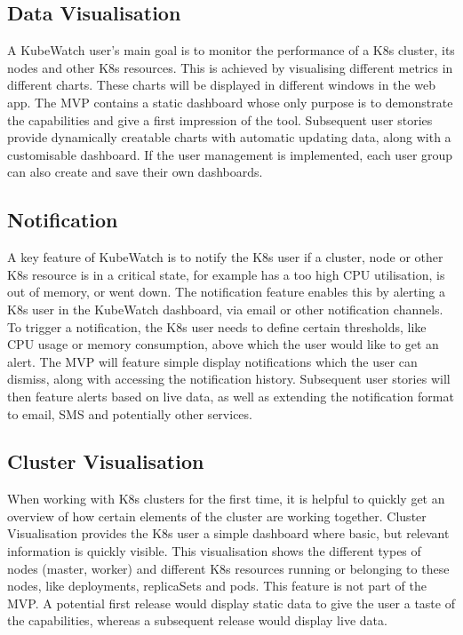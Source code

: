 \subsection{Data Visualisation}
A KubeWatch user's main goal is to monitor the performance of a K8s cluster, its nodes and other K8s resources. This is achieved by visualising different metrics in different charts. These charts will be displayed in different windows in the web app. The MVP contains a static dashboard whose only purpose is to demonstrate the capabilities and give a first impression of the tool. Subsequent user stories provide dynamically creatable charts with automatic updating data, along with a customisable dashboard. If the user management is implemented, each user group can also create and save their own dashboards.

\subsection{Notification}
A key feature of KubeWatch is to notify the K8s user if a cluster, node or other K8s resource is in a critical state, for example has a too high CPU utilisation, is out of memory, or went down. The notification feature enables this by alerting a K8s user in the KubeWatch dashboard, via email or other notification channels. To trigger a notification, the K8s user needs to define certain thresholds, like CPU usage or memory consumption, above which the user would like to get an alert. The MVP will feature simple display notifications which the user can dismiss, along with accessing the notification history. Subsequent user stories will then feature alerts based on live data, as well as extending the notification format to email, SMS and potentially other services.

\subsection{Cluster Visualisation}
When working with K8s clusters for the first time, it is helpful to quickly get an overview of how certain elements of the cluster are working together. Cluster Visualisation provides the K8s user a simple dashboard where basic, but relevant information is quickly visible. This visualisation shows the different types of nodes (master, worker) and different K8s resources running or belonging to these nodes, like deployments, replicaSets and pods. This feature is not part of the MVP. A potential first release would display static data to give the user a taste of the capabilities, whereas a subsequent release would display live data. 

